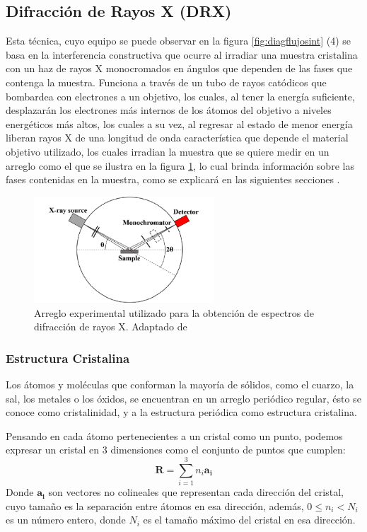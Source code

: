 \documentclass[../main.tex]{subfiles}
\begin{document}
\subsection{Difracción de Rayos X (DRX)}
Esta técnica, cuyo equipo se puede observar en la figura \ref{fig:diagflujosint} (4) se basa en la interferencia constructiva que ocurre al irradiar una muestra cristalina con un haz de rayos X monocromados en ángulos que dependen de las fases que contenga la muestra. Funciona a través de un tubo de rayos catódicos que bombardea con electrones a un objetivo, los cuales, al tener la energía suficiente, desplazarán los electrones más internos de los átomos del objetivo a niveles energéticos más altos, los cuales a su vez, al regresar al estado de menor energía liberan rayos X de una longitud de onda característica que depende el material objetivo utilizado, los cuales irradian la muestra que se quiere medir en un arreglo como el que se ilustra en la figura \ref{fig:diagDRX}, lo cual brinda información sobre las fases contenidas en la muestra, como se explicará en las siguientes secciones \cite{dutrowxrd}.
\begin{figure}[H]
    \centering
    \includegraphics[width=0.6\textwidth]{fig/DRXdiag.png}
    \caption{Arreglo experimental utilizado para la obtención de espectros de difracción de rayos X. Adaptado de \cite{Jung2023}}
    \label{fig:diagDRX}
\end{figure}
\subsubsection{Estructura Cristalina}
Los átomos y moléculas que conforman la mayoría de sólidos, como el cuarzo, la sal, los metales o los óxidos, se encuentran en un arreglo periódico regular, ésto se conoce como cristalinidad, y a la estructura periódica como estructura cristalina.

Pensando en cada átomo pertenecientes a un cristal como un punto, podemos expresar un cristal en 3 dimensiones como el conjunto de puntos que cumplen:
\begin{equation}
    \pmb{R}=\sum_{i=1}^{3} n_i\pmb{a_i}  
    \label{eq:estrcrist}
\end{equation}
Donde $\pmb{a_i}$ son vectores no colineales que representan cada dirección del cristal, cuyo tamaño es la separación entre átomos en esa dirección, además, $0\leq n_i<N_i$ es un número entero, donde $N_i$ es el tamaño máximo del cristal en esa dirección.
\end{document}
